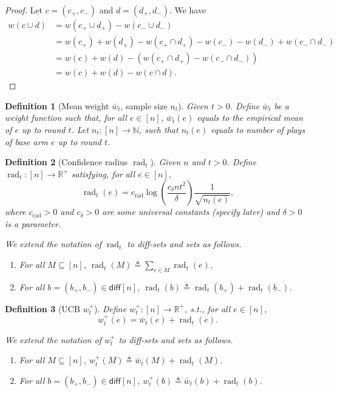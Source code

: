 \documentclass{article}
\newtheorem{define}{Definition}
\newcommand{\diff}{\mathsf{diff}}
\newcommand{\RR}{\mathbb R}
\DeclareMathOperator{\rad}{rad}
\begin{document}
\begin{spacing}{1.1}
\begin{proof}
Let $c=(c_+,c_-)$ and $d=(d_+,d_-)$.
We have
\begin{align}
w(c\cup d) &= w(c_+\cup d_+)-w(c_-\cup d_-)\\
           &= w(c_+)+w(d_+)-w(c_+\cap d_+)-w(c_-)-w(d_-)+w(c_- \cap d_-)\\
           &= w(c)+w(d)-(w(c_+\cap d_+)-w(c_-\cap d_-))\\
           &= w(c)+w(d)-w(c\cap d).
\end{align}
\end{proof}

\begin{define}[Mean weight $\bar w_t$, sample size $n_t$]
Given $t>0$. 
Define $\bar w_t$ be a weight function such that, for all $e\in[n]$, $\bar w_t(e)$ equals to the empirical mean of $e$ up to round $t$.
Let $n_t: [n] \rightarrow \mathbb N$, such that $n_t(e)$ equals to number of plays of base arm $e$ up to round $t$.
\end{define}

\begin{define}[Confidence radius $\rad_t$]
Given $n$ and $t>0$.
Define $\rad_t:[n]\rightarrow \RR^+$ satisfying, for all $e\in[n]$,
\begin{equation}
\label{eq:define-confidence-radius}
\rad_t(e) = c_{\rad}\log\left(\frac{c_\delta nt^2}\delta\right)\frac{1}{\sqrt{n_t(e)}},
\end{equation}
where $c_{\rad} > 0$  and $c_\delta>0$ are some universal constants (specify later) and $\delta > 0$ is a parameter.

We extend the notation of $\rad_t$ to diff-sets and sets as follows.
\begin{enumerate}
\item For all $M \subseteq [n]$, $\rad_t(M) \triangleq \sum_{e\in M} \rad_t(e)$.
\item For all $b=(b_+,b_-)\in \diff[n]$, $\rad_t(b) \triangleq \rad_t(b_+)+\rad_t(b_-)$.
\end{enumerate}

\end{define}

\begin{define}[UCB $w_t^+$]
Define $w^+_t: [n] \rightarrow \RR^+$, s.t., for all $e\in[n]$,  
$$ w^+_t(e)=\bar w_t(e)+\rad_t(e).$$

We extend the notation of $w_t^+$ to diff-sets and sets as follows.
\begin{enumerate}
\item For all $M \subseteq [n]$, $w_t^+(M) \triangleq \bar w_t(M)+\rad_t(M)$.
\item For all $b=(b_+,b_-)\in \diff[n]$, $w_t^+(b) \triangleq \bar w_t(b)+\rad_t(b)$.
\end{enumerate}


\end{define}
\end{spacing}
\end{document}
